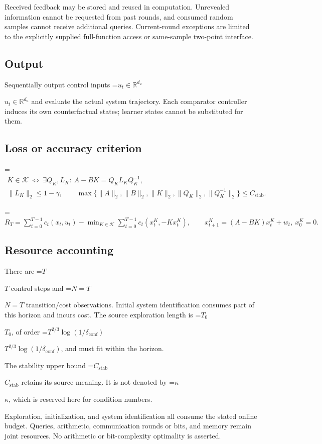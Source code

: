 \documentclass[10pt,a4paper]{article}
\newcommand{\AtlasMath}[1]{\par\begingroup\centering\setbox0=\hbox{$\displaystyle #1$}\ifdim\wd0>1.4\linewidth\typeout{ATLAS WIDE FORMULA: \the\wd0}\fi\ifdim\wd0>\linewidth\resizebox{\linewidth}{!}{\box0}\else\box0\fi\par\endgroup}
\newcommand{\AtlasInlineMath}[1]{\begingroup\setbox0=\hbox{$#1$}\ifdim\wd0>.4\linewidth\endgroup\AtlasMath{#1}\else\endgroup$#1$\fi}
\begin{document}
Received feedback may be stored and reused in computation. Unrevealed information cannot be requested from past rounds, and consumed random samples cannot receive additional queries. Current-round exceptions are limited to the explicitly supplied full-function access or same-sample two-point interface.

\subsection{Output}
Sequentially output control inputs \AtlasInlineMath{u_t\in\mathbb{R}^{d_u}} and evaluate the actual system trajectory. Each comparator controller induces its own counterfactual states; learner states cannot be substituted for them.

\subsection{Loss or accuracy criterion}

\AtlasMath{\begin{gathered}K\in\mathcal{K}\ \Longleftrightarrow\ \exists Q_K,L_K:\ A-BK=Q_KL_KQ_K^{-1},\\ \|L_K\|_2\le1-\gamma,\qquad \max\{\|A\|_2,\|B\|_2,\|K\|_2,\|Q_K\|_2,\|Q_K^{-1}\|_2\}\le C_{\mathrm{stab}}.\end{gathered}}



\AtlasMath{R_T=\sum_{t=0}^{T-1}c_t(x_t,u_t)-\min_{K\in\mathcal K}\sum_{t=0}^{T-1}c_t(x_t^K,-Kx_t^K),\qquad x_{t+1}^K=(A-BK)x_t^K+w_t,\ x_0^K=0.}


\subsection{Resource accounting}
There are \AtlasInlineMath{T} control steps and \AtlasInlineMath{N=T} transition/cost observations. Initial system identification consumes part of this horizon and incurs cost. The source exploration length is \AtlasInlineMath{T_0}, of order \AtlasInlineMath{T^{2/3}\log(1/\delta_{\mathrm{conf}})}, and must fit within the horizon.

The stability upper bound \AtlasInlineMath{C_{\mathrm{stab}}} retains its source meaning. It is not denoted by \AtlasInlineMath{\kappa}, which is reserved here for condition numbers.

Exploration, initialization, and system identification all consume the stated online budget. Queries, arithmetic, communication rounds or bits, and memory remain joint resources. No arithmetic or bit-complexity optimality is asserted.
\end{document}
